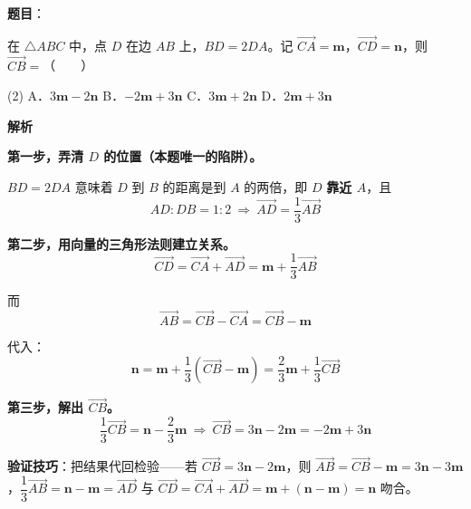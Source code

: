 \begin{answer}

\textbf{题目}：

在 $\triangle ABC$ 中，点 $D$ 在边 $AB$ 上，$BD=2DA$。记 $\overrightarrow{CA}=\boldsymbol m$，$\overrightarrow{CD}=\boldsymbol n$，则 $\overrightarrow{CB}=$\mbox{（　　）}

\begin{gkopts}(2)
\task A．$3\boldsymbol m-2\boldsymbol n$
\task B．$-2\boldsymbol m+3\boldsymbol n$
\task C．$3\boldsymbol m+2\boldsymbol n$
\task D．$2\boldsymbol m+3\boldsymbol n$
\end{gkopts}

\textbf{解析}

\textbf{第一步，弄清 $D$ 的位置（本题唯一的陷阱）。}

$BD=2DA$ 意味着 $D$ 到 $B$ 的距离是到 $A$ 的两倍，即 $D$ \textbf{靠近 $A$}，且
\nopagebreak[4]
\[AD:DB=1:2\ \Longrightarrow\ \overrightarrow{AD}=\frac13\overrightarrow{AB}\]

\textbf{第二步，用向量的三角形法则建立关系。}
\nopagebreak[4]
\[\overrightarrow{CD}=\overrightarrow{CA}+\overrightarrow{AD}=\boldsymbol m+\frac13\overrightarrow{AB}\]

而
\nopagebreak[4]
\[\overrightarrow{AB}=\overrightarrow{CB}-\overrightarrow{CA}=\overrightarrow{CB}-\boldsymbol m\]

代入：
\nopagebreak[4]
\[\boldsymbol n=\boldsymbol m+\frac13\left(\overrightarrow{CB}-\boldsymbol m\right)=\frac23\boldsymbol m+\frac13\overrightarrow{CB}\]

\textbf{第三步，解出 $\overrightarrow{CB}$。}
\nopagebreak[4]
\[\frac13\overrightarrow{CB}=\boldsymbol n-\frac23\boldsymbol m\ \Longrightarrow\ \overrightarrow{CB}=3\boldsymbol n-2\boldsymbol m=-2\boldsymbol m+3\boldsymbol n\]

\begin{gktip}
\textbf{验证技巧}：把结果代回检验——若 $\overrightarrow{CB}=3\boldsymbol n-2\boldsymbol m$，则 $\overrightarrow{AB}=\overrightarrow{CB}-\boldsymbol m=3\boldsymbol n-3\boldsymbol m$，$\dfrac13\overrightarrow{AB}=\boldsymbol n-\boldsymbol m=\overrightarrow{AD}$  与 $\overrightarrow{CD}=\overrightarrow{CA}+\overrightarrow{AD}=\boldsymbol m+(\boldsymbol n-\boldsymbol m)=\boldsymbol n$ 吻合。
\end{gktip}


\par\medskip

\end{answer}
